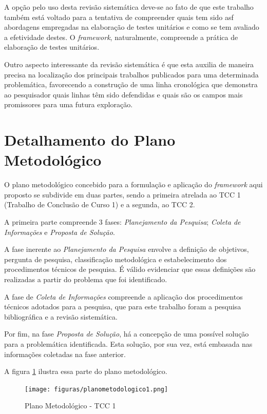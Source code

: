 A opção pelo uso desta revisão sistemática deve-se ao fato de que este trabalho também está voltado para a tentativa de compreender quais tem sido asf abordagens empregadas na elaboração de testes unitários e como se tem avaliado a efetividade destes. O \textit{framework}, naturalmente, compreende a prática de elaboração de testes unitários.

Outro aspecto interessante da revisão sistemática é que esta auxilia de maneira precisa na localização dos principais trabalhos publicados para uma determinada problemática, favorecendo a construção de uma linha cronológica que demonstra ao pesquisador quais linhas têm sido defendidas e quais são os campos mais promissores para uma futura exploração.

\section{Detalhamento do Plano Metodológico}

O plano metodológico concebido para a formulação e aplicação do \textit{framework} aqui proposto se subdivide em duas partes, sendo a primeira atrelada ao TCC 1 (Trabalho de Conclusão de Curso 1) e a segunda, ao TCC 2.

A primeira parte compreende 3 fases: \textit{Planejamento da Pesquisa}; \textit{Coleta de Informações} e \textit{Proposta de Solução}.

A fase inerente ao \textit{Planejamento da Pesquisa} envolve a definição de objetivos, pergunta de pesquisa, classificação metodológica e estabelecimento dos procedimentos técnicos de pesquisa. É válido evidenciar que essas definições são realizadas a partir do problema que foi identificado.

A fase de \textit{Coleta de Informações} compreende a aplicação dos procedimentos técnicos adotados para a pesquisa, que para este trabalho foram a pesquisa bibliográfica e a revisão sistemática.

Por fim, na fase \textit{Proposta de Solução}, há a concepção de uma possível solução para a problemática identificada. Esta solução, por sua vez, está embasada nas informações coletadas na fase anterior.

A figura \ref{fig:plano1} ilustra essa parte do plano metodológico.

\begin{figure}[h]
\texttt{[image: figuras/planometodologico1.png]}
\caption{Plano Metodológico - TCC 1}
\label{fig:plano1}
\end{figure}

